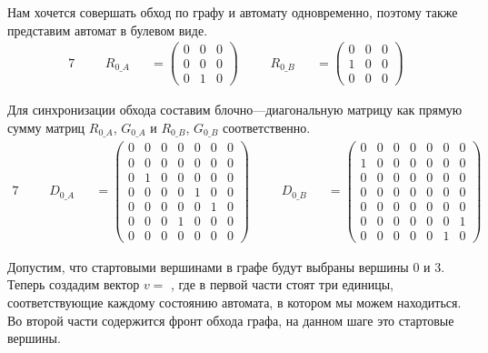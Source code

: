 \begin{example}
  Нам хочется совершать обход по графу и автомату одновременно, поэтому также представим автомат в булевом виде.
  \begin{alignat*}{7}
    & &&R_{0\_A} &&= \begin{pmatrix}
      0 & 0 & 0 \\
      0 & 0 & 0 \\
      0 & 1 & 0 
      \end{pmatrix} \ \ \ \ &&R_{0\_B} &&= \begin{pmatrix}
        0 & 0 & 0 \\
        1 & 0 & 0 \\
        0 & 0 & 0 
        \end{pmatrix}
    \end{alignat*}

  Для синхронизации обхода составим блочно---диагональную матрицу как прямую сумму матриц $R_{0\_A}$, $G_{0\_A}$ и $R_{0\_B}$, $G_{0\_B}$ соответственно.
  \begin{alignat*}{7}
    & &&D_{0\_A} &&= \begin{pmatrix}
      0 & 0 & 0 & 0 & 0 & 0 & 0 \\
      0 & 0 & 0 & 0 & 0 & 0 & 0 \\
      0 & 1 & 0 & 0 & 0 & 0 & 0 \\
      0 & 0 & 0 & 0 & 1 & 0 & 0 \\
      0 & 0 & 0 & 0 & 0 & 1 & 0 \\
      0 & 0 & 0 & 1 & 0 & 0 & 0 \\
      0 & 0 & 0 & 0 & 0 & 0 & 0 
      \end{pmatrix} \ \ \ \ &&D_{0\_B} &&= \begin{pmatrix}
        0 & 0 & 0 & 0 & 0 & 0 & 0 \\
        1 & 0 & 0 & 0 & 0 & 0 & 0 \\
        0 & 0 & 0 & 0 & 0 & 0 & 0 \\
        0 & 0 & 0 & 0 & 0 & 0 & 0 \\
        0 & 0 & 0 & 0 & 0 & 0 & 0 \\
        0 & 0 & 0 & 0 & 0 & 0 & 1 \\
        0 & 0 & 0 & 0 & 0 & 1 & 0 
        \end{pmatrix}
    \end{alignat*}

  Допустим, что стартовыми вершинами в графе будут выбраны вершины 0 и 3.
  Теперь создадим вектор $v = $  , где в первой части стоят три единицы, соответствующие каждому состоянию автомата, в котором мы можем находиться. Во второй части содержится фронт обхода графа, на данном шаге это стартовые вершины.
  

\end{example}

